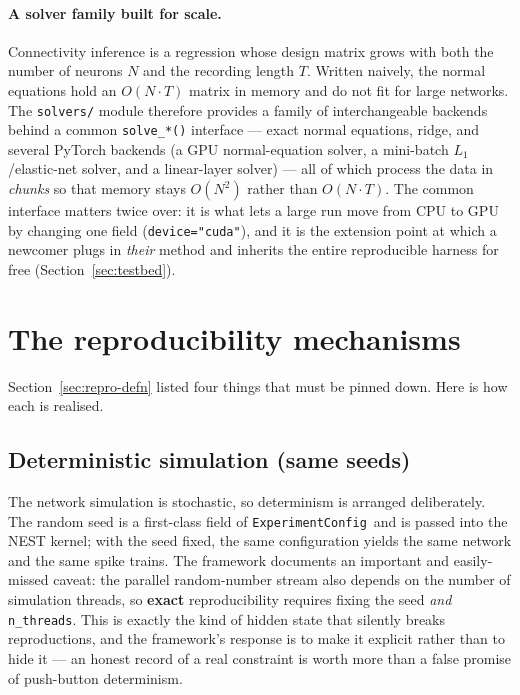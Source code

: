 \documentclass[11pt,a4paper]{article}
\newcommand{\code}[1]{\texttt{#1}}
\newcommand{\config}{\code{ExperimentConfig}}
\begin{document}
\paragraph{A solver family built for scale.}
Connectivity inference is a regression whose design matrix grows with both the number of
neurons $N$ and the recording length $T$. Written naively, the normal equations hold an
$O(N\cdot T)$ matrix in memory and do not fit for large networks. The \code{solvers/} module
therefore provides a family of interchangeable backends behind a common \code{solve\_*()}
interface --- exact normal equations, ridge, and several PyTorch backends (a GPU normal-equation
solver, a mini-batch $L_1$/elastic-net solver, and a linear-layer solver) --- all of which
process the data in \emph{chunks} so that memory stays $O(N^2)$ rather than $O(N\cdot T)$. The
common interface matters twice over: it is what lets a large run move from CPU to GPU by
changing one field (\code{device="cuda"}), and it is the extension point at which a newcomer
plugs in \emph{their} method and inherits the entire reproducible harness for free
(Section~\ref{sec:testbed}).

\section{The reproducibility mechanisms}
\label{sec:mechanisms}

Section~\ref{sec:repro-defn} listed four things that must be pinned down. Here is how each is
realised.

\subsection{Deterministic simulation (same seeds)}
The network simulation is stochastic, so determinism is arranged deliberately. The random seed
is a first-class field of \config\ and is passed into the NEST kernel; with the seed fixed, the
same configuration yields the same network and the same spike trains. The framework documents an
important and easily-missed caveat: the parallel random-number stream also depends on the number
of simulation threads, so \textbf{exact} reproducibility requires fixing the seed \emph{and}
\code{n\_threads}. This is exactly the kind of hidden state that silently breaks reproductions,
and the framework's response is to make it explicit rather than to hide it --- an honest record
of a real constraint is worth more than a false promise of push-button determinism.
\end{document}
